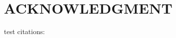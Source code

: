 \documentclass[letterpaper, 10 pt, conference]{ieeeconf}  %
\begin{document}


\section*{ACKNOWLEDGMENT}

test citations:

~\cite{ORB}
~\cite{target}
~\cite{3Dshape}





\end{document}
